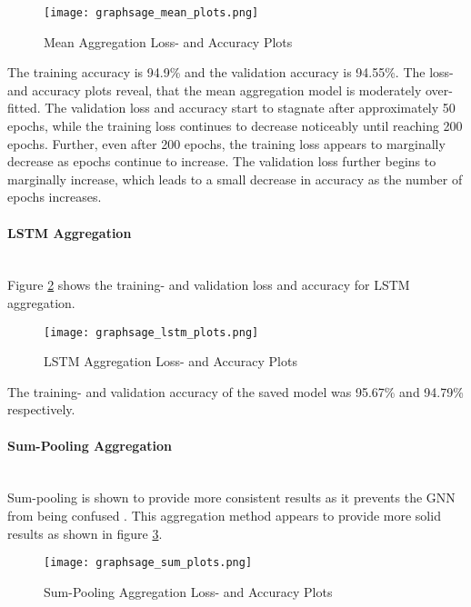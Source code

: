   \begin{figure}[h]
		\centering
		\texttt{[image: graphsage\_mean\_plots.png]}
		\caption{Mean Aggregation Loss- and Accuracy Plots}
        \label{fig:mean_aggregation}
  \end{figure}

  \noindent The training accuracy is 94.9\% and the validation accuracy is 
  94.55\%. The loss- and accuracy plots reveal, that the mean aggregation model 
  is moderately over-fitted. The validation loss and accuracy start to stagnate 
  after approximately 50 epochs, while the training loss continues to decrease 
  noticeably until reaching 200 epochs. Further, even after 200 epochs, the 
  training loss appears to marginally decrease as epochs continue to increase. 
  The validation loss further begins to marginally increase, which leads to a 
  small decrease in accuracy as the number of epochs increases.

  \paragraph{LSTM Aggregation}  \mbox{}\\ 
  Figure \ref{fig:lstm_aggregation} shows the training- and validation loss
  and accuracy for LSTM aggregation. 

  \begin{figure}[h]
		\centering
		\texttt{[image: graphsage\_lstm\_plots.png]}
		\caption{LSTM Aggregation Loss- and Accuracy Plots}
        \label{fig:lstm_aggregation}
  \end{figure}

  \noindent The training- and validation accuracy of the saved model was 
  95.67\% and 94.79\% respectively. 

  \paragraph{Sum-Pooling Aggregation}  \mbox{}\\ 
  Sum-pooling is shown to provide more consistent results as it prevents the
  GNN from being confused \citep{xu2018powerful}. This aggregation method
  appears to provide more solid results as shown in figure 
  \ref{fig:sum_aggregation}. 

  \begin{figure}[h]
		\centering
		\texttt{[image: graphsage\_sum\_plots.png]}
		\caption{Sum-Pooling Aggregation Loss- and Accuracy Plots}
        \label{fig:sum_aggregation}
  \end{figure}

